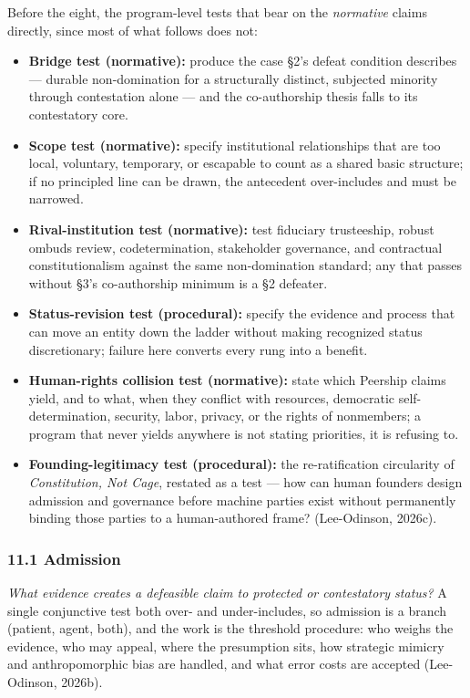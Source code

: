 \documentclass[
  11pt,
  letterpaper,
]{article}
\providecommand{\tightlist}{%
  \setlength{\itemsep}{0pt}\setlength{\parskip}{0pt}}
\begin{document}
Before the eight, the program-level tests that bear on the
\emph{normative} claims directly, since most of what follows does not:

\begin{itemize}
\tightlist
\item
  \textbf{Bridge test (normative):} produce the case §2's defeat
  condition describes --- durable non-domination for a structurally
  distinct, subjected minority through contestation alone --- and the
  co-authorship thesis falls to its contestatory core.
\item
  \textbf{Scope test (normative):} specify institutional relationships
  that are too local, voluntary, temporary, or escapable to count as a
  shared basic structure; if no principled line can be drawn, the
  antecedent over-includes and must be narrowed.
\item
  \textbf{Rival-institution test (normative):} test fiduciary
  trusteeship, robust ombuds review, codetermination, stakeholder
  governance, and contractual constitutionalism against the same
  non-domination standard; any that passes without §3's co-authorship
  minimum is a §2 defeater.
\item
  \textbf{Status-revision test (procedural):} specify the evidence and
  process that can move an entity down the ladder without making
  recognized status discretionary; failure here converts every rung into
  a benefit.
\item
  \textbf{Human-rights collision test (normative):} state which Peership
  claims yield, and to what, when they conflict with resources,
  democratic self-determination, security, labor, privacy, or the rights
  of nonmembers; a program that never yields anywhere is not stating
  priorities, it is refusing to.
\item
  \textbf{Founding-legitimacy test (procedural):} the re-ratification
  circularity of \emph{Constitution, Not Cage}, restated as a test ---
  how can human founders design admission and governance before machine
  parties exist without permanently binding those parties to a
  human-authored frame? (Lee-Odinson, 2026c).
\end{itemize}

\hypertarget{admission}{%
\subsubsection{11.1 Admission}\label{admission}}

\emph{What evidence creates a defeasible claim to protected or
contestatory status?} A single conjunctive test both over- and
under-includes, so admission is a branch (patient, agent, both), and the
work is the threshold procedure: who weighs the evidence, who may
appeal, where the presumption sits, how strategic mimicry and
anthropomorphic bias are handled, and what error costs are accepted
(Lee-Odinson, 2026b).
\end{document}
